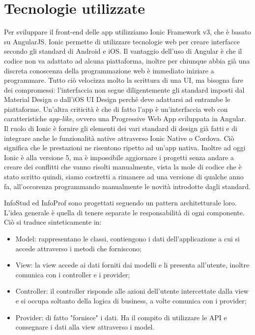 \documentclass[Lau, oneside]{sapthesis}%
\begin{document}
\section{Tecnologie utilizzate}
\label{sec:tech}
Per sviluppare il front-end delle app utilizziamo Ionic Framework v3, che è basato su AngularJS. Ionic permette di utilizzare tecnologie web per creare interfacce secondo gli standard di Android e iOS. Il vantaggio dell'uso di Angular è che il codice non va adattato ad alcuna piattaforma, inoltre per chiunque abbia già una discreta conoscenza della programmazione web è immediato iniziare a programmare. Tutto ciò velocizza molto la scrittura di una UI, ma bisogna fare dei compromessi: l'interfaccia non segue diligentemente gli standard imposti dal Material Design o dall'iOS UI Design perché deve adattarsi ad entrambe le piattaforme. Un'altra criticità è che di fatto l'app è un'interfaccia web con caratteristiche \textit{app-like}, ovvero una Progressive Web App sviluppata in Angular. 
Il ruolo di Ionic è fornire gli elementi dei vari standard di design già fatti e di integrare anche le funzionalità native attraverso Ionic Native o Cordova. Ciò significa che le prestazioni ne risentono ripetto ad un'app nativa. Inoltre ad oggi Ionic è alla versione 5, ma è impossibile aggiornare i progetti senza andare a creare dei conflitti che vanno risolti manualmente, vista la mole di codice che è stato scritto quindi, siamo costretti a rimanere ad una versione di qualche anno fa, all'occorenza programmando manualmente le novità introdotte dagli standard.

InfoStud ed InfoProf sono progettati seguendo un pattern architetturale loro. L'idea generale è quella di tenere separate le responsabilità di ogni componente. Ciò si traduce sinteticamente in:

\begin{itemize}
	\item Model: rappresentano le classi, contiengono i dati dell'applicazione a cui si accede attraverso i metodi che forniscono;
	\item View: la view accede ai dati forniti dai modelli e li presenta all'utente, inoltre comunica con i controller e i provider;
	\item Controller: il controller risponde alle azioni dell'utente intercettate dalla view e si occupa soltanto della logica di business, a volte comunica con i provider;
	\item Provider: di fatto "fornisce" i dati. Ha il compito di utilizzare le API e consegnare i dati alla view attraverso i model.
\end{itemize}
\end{document}

